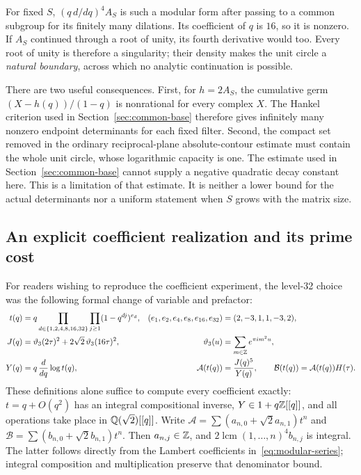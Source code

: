 For fixed $S$, $(q\,d/dq)^4A_S$ is such a modular form after passing
to a common subgroup for its finitely many dilations. Its coefficient
of $q$ is $16$, so it is nonzero. If $A_S$ continued through a root
of unity, its fourth derivative would too. Every root of unity is
therefore a singularity; their density makes the unit circle a
\emph{natural boundary}, across which no analytic continuation is possible.

There are two useful consequences. First, for $h=2A_S$, the cumulative
germ $(X-h(q))/(1-q)$ is nonrational for every complex $X$. The
Hankel criterion used in Section~\ref{sec:common-base} therefore gives
infinitely many nonzero endpoint determinants for each fixed filter.
Second, the compact set removed in the ordinary reciprocal-plane
absolute-contour estimate must contain the whole unit circle, whose
logarithmic capacity is one. The estimate used in
Section~\ref{sec:common-base} cannot supply a negative quadratic decay
constant here. This is a limitation of that estimate. It is neither
a lower bound for the actual determinants nor a uniform statement
when $S$ grows with the matrix size.

\subsection{An explicit coefficient realization and its prime cost}
For readers wishing to reproduce the coefficient experiment, the
level-32 choice was the following formal change of variable and prefactor:
\begin{align*}
 t(q)&=q\prod_{d\in\{1,2,4,8,16,32\}}\prod_{j\geq1}
                 (1-q^{dj})^{e_d},
       &(e_1,e_2,e_4,e_8,e_{16},e_{32})&=(2,-3,1,1,-3,2),\\
 J(q)&=\vartheta_3(2\tau)^2+2\sqrt2\,\vartheta_3(16\tau)^2,
       &\vartheta_3(u)&=\sum_{m\in\mathbb Z}e^{\pi i m^2u},\\
 Y(q)&=q\,\frac{d}{dq}\log t(q),&
 \mathcal A(t(q))&=\frac{J(q)^5}{Y(q)},\qquad
 \mathcal B(t(q))=\mathcal A(t(q))H(\tau).
\end{align*}
These definitions alone suffice to compute every coefficient exactly:
$t=q+O(q^2)$ has an integral compositional inverse,
$Y\in1+q\mathbb Z[[q]]$, and all operations take place in
$\mathbb Q(\sqrt2)[[q]]$. Write
$\mathcal A=\sum(a_{n,0}+\sqrt2a_{n,1})t^n$ and
$\mathcal B=\sum(b_{n,0}+\sqrt2b_{n,1})t^n$.
Then $a_{n,j}\in\mathbb Z$, and $2\operatorname{lcm}(1,\ldots,n)^4b_{n,j}$
is integral. The latter follows directly from the Lambert coefficients
in~\eqref{eq:modular-series}; integral composition and multiplication
preserve that denominator bound.

